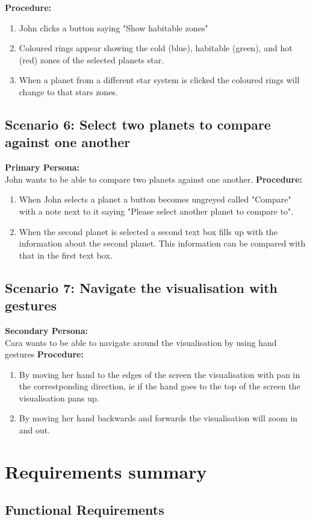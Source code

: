   {\bf  Procedure:}
   \begin{enumerate}
 \item John clicks a button saying "Show habitable zones"
 \item Coloured rings appear showing the cold (blue), habitable (green), and hot (red) zones of the selected planets star.
 \item When a planet from a different star system is clicked the coloured rings will change to that stars zones.
 \end{enumerate}
 \subsection{Scenario 6: Select two planets to compare against one another}
    {\bf  Primary Persona:}\\
John wants to be able to compare two planets against one another.
  {\bf  Procedure:}
   \begin{enumerate}
 \item When John selects a planet a button becomes ungreyed called "Compare" with a note next to it saying "Please select another planet to compare to".
 \item When the second planet is selected a second text box fills up with the information about the second planet. This information can be compared with that in the first text box.
  \end{enumerate}
  
 \subsection{Scenario 7: Navigate the visualisation with gestures}
    {\bf  Secondary Persona:}\\
Cara wants to be able to navigate around the visualisation by using hand gestures
  {\bf  Procedure:}
   \begin{enumerate}
 \item By moving her hand to the edges of the screen the visualisation with pan in the correstponding direction, ie if the hand goes to the top of the screen the visualisation pans up.
 \item By moving her hand backwards and forwards the visualisation will zoom in and out.
  \end{enumerate}
\section{Requirements summary}
\subsection{Functional Requirements}
